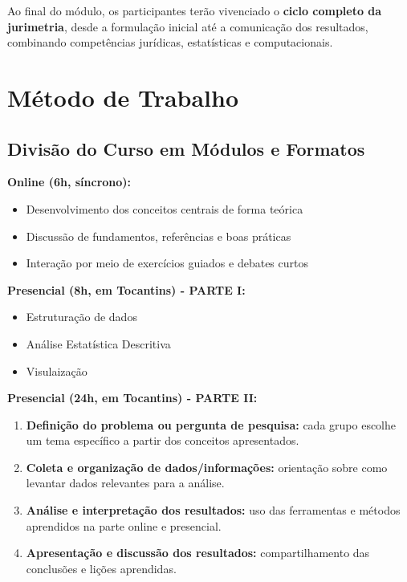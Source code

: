 \documentclass[
  letterpaper,
  DIV=11,
  numbers=noendperiod]{scrreprt}
\providecommand{\tightlist}{%
  \setlength{\itemsep}{0pt}\setlength{\parskip}{0pt}}
\begin{document}
Ao final do módulo, os participantes terão vivenciado o \textbf{ciclo
completo da jurimetria}, desde a formulação inicial até a comunicação
dos resultados, combinando competências jurídicas, estatísticas e
computacionais.

\section{Método de Trabalho}\label{muxe9todo-de-trabalho}

\subsection{Divisão do Curso em Módulos e
Formatos}\label{divisuxe3o-do-curso-em-muxf3dulos-e-formatos}

\textbf{Online (6h, síncrono):}

\begin{itemize}
\tightlist
\item
  Desenvolvimento dos conceitos centrais de forma teórica\\
\item
  Discussão de fundamentos, referências e boas práticas\\
\item
  Interação por meio de exercícios guiados e debates curtos
\end{itemize}

\textbf{Presencial (8h, em Tocantins) - PARTE I:}

\begin{itemize}
\tightlist
\item
  Estruturação de dados\\
\item
  Análise Estatística Descritiva\\
\item
  Visulaização
\end{itemize}

\textbf{Presencial (24h, em Tocantins) - PARTE II:}

\begin{enumerate}
\def\labelenumi{\arabic{enumi}.}
\tightlist
\item
  \textbf{Definição do problema ou pergunta de pesquisa:} cada grupo
  escolhe um tema específico a partir dos conceitos apresentados.\\
\item
  \textbf{Coleta e organização de dados/informações:} orientação sobre
  como levantar dados relevantes para a análise.\\
\item
  \textbf{Análise e interpretação dos resultados:} uso das ferramentas e
  métodos aprendidos na parte online e presencial.\\
\item
  \textbf{Apresentação e discussão dos resultados:} compartilhamento das
  conclusões e lições aprendidas.
\end{enumerate}
\end{document}
